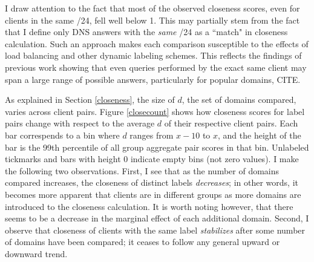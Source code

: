 I draw attention to the fact that most of the observed closeness scores, even for clients in the
same /24, fell well below 1. This may partially stem from the fact that I define only DNS answers
with the \emph{same} /24 as a ``match" in closeness calculation. Such an approach makes each
comparison susceptible to the effects of load balancing and other dynamic labeling schemes. This
reflects the findings of previous work showing that even queries performed by the exact
same client may span a large range of possible answers, particularly for popular domains, CITE. 

As explained in Section \ref{closeness}, the size of $d$, the set of domains compared, varies across client
pairs. Figure \ref{closecount} shows how closeness scores for label pairs change with respect to the
average $d$ of their respective client pairs. Each bar correspends to a bin where $d$ ranges from
$x-10$ to $x$, and the height of the bar is the 99th percentile of all group aggregate pair scores
in that bin. Unlabeled tickmarks and bars with height 0 indicate empty bins (not zero values). I make the following
two observations. First, I see that as the number of domains compared increases, the closeness of
distinct labels \emph{decreases}; in other words, it becomes more apparent that clients are in
different groups as more domains are introduced to the closeness calculation. It is worth noting
however, that there seems to be a decrease in the marginal effect of each additional domain. Second,
I observe that closeness of clients with the same label \emph{stabilizes} after some number of
domains have been compared; it ceases to follow any general upward or downward trend.

